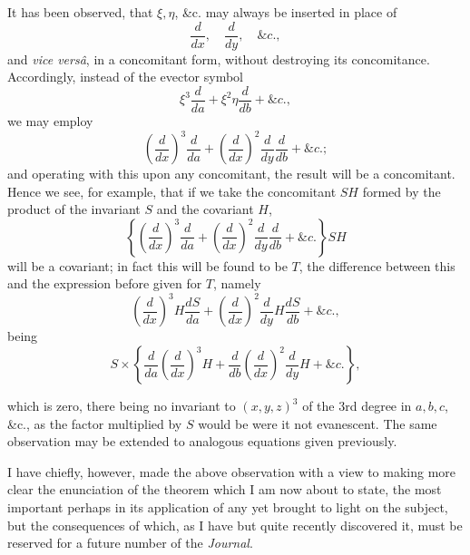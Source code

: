 \documentclass[11pt]{article}
\newcommand{\sourcepage}[1]{\marginpar{\scriptsize p.~#1}}
\begin{document}
It has been observed, that $\xi,\eta$, \&c. may always be inserted in place of
\[
\frac{d}{dx},\quad \frac{d}{dy},\quad \&c.,
\]
and \emph{vice versâ}, in a concomitant form, without destroying its concomitance. Accordingly, instead of the evector symbol
\[
\xi^3\frac{d}{da}+\xi^2\eta\frac{d}{db}+\&c.,
\]
we may employ
\[
\left(\frac{d}{dx}\right)^3\frac{d}{da}
+\left(\frac{d}{dx}\right)^2\frac{d}{dy}\frac{d}{db}+\&c.;
\]
and operating with this upon any concomitant, the result will be a concomitant. Hence we see, for example, that if we take the concomitant $SH$ formed by the product of the invariant $S$ and the covariant $H$,
\[
\left\{\left(\frac{d}{dx}\right)^3\frac{d}{da}
+\left(\frac{d}{dx}\right)^2\frac{d}{dy}\frac{d}{db}+\&c.\right\}SH
\]
will be a covariant; in fact this will be found to be $T$, the difference between this and the expression before given for $T$, namely
\[
\left(\frac{d}{dx}\right)^3H\frac{dS}{da}
+\left(\frac{d}{dx}\right)^2\frac{d}{dy}H\frac{dS}{db}+\&c.,
\]
being
\[
S\times\left\{\frac{d}{da}\left(\frac{d}{dx}\right)^3H
+\frac{d}{db}\left(\frac{d}{dx}\right)^2\frac{d}{dy}H+\&c.\right\},
\]

\sourcepage{340}
which is zero, there being no invariant to $(x,y,z)^3$ of the 3rd degree in $a,b,c$, \&c., as the factor multiplied by $S$ would be were it not evanescent. The same observation may be extended to analogous equations given previously.

I have chiefly, however, made the above observation with a view to making more clear the enunciation of the theorem which I am now about to state, the most important perhaps in its application of any yet brought to light on the subject, but the consequences of which, as I have but quite recently discovered it, must be reserved for a future number of the \emph{Journal}.
\end{document}
